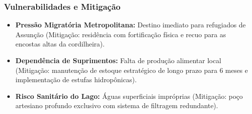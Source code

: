 \subsubsection{Vulnerabilidades e
Mitigação}

\begin{itemize}
\tightlist
\item
  \textbf{Pressão Migratória Metropolitana:} Destino imediato para
  refugiados de Assunção (Mitigação: residência com fortificação física
  e recuo para as encostas altas da cordilheira).
\item
  \textbf{Dependência de Suprimentos:} Falta de produção alimentar local
  (Mitigação: manutenção de estoque estratégico de longo prazo para 6
  meses e implementação de estufas hidropônicas).
\item
  \textbf{Risco Sanitário do Lago:} Águas superficiais impróprias
  (Mitigação: poço artesiano profundo exclusivo com sistema de filtragem
  redundante).
\end{itemize}

